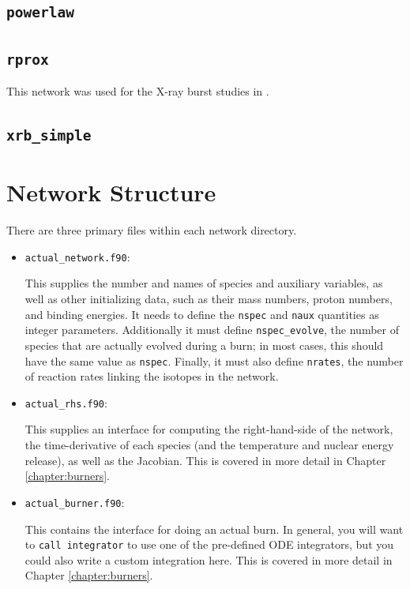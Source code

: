 \subsection{{\tt powerlaw}}


\subsection{{\tt rprox}}

This network was used for the X-ray burst studies in \cite{xrb:II,xrb:III}.


\subsection{{\tt xrb\_simple}}



\section{Network Structure}
\label{section:network_structure}

There are three primary files within each network directory.

\begin{itemize}

\item {\tt actual\_network.f90}:

 This supplies the number and names of species and
auxiliary variables, as well as other initializing data, such as their
mass numbers, proton numbers, and binding energies. It needs to define
the {\tt nspec} and {\tt naux} quantities as integer parameters. Additionally
it must define {\tt nspec\_evolve}, the number of species that are actually evolved
during a burn; in most cases, this should have the same value as {\tt nspec}.
Finally, it must also define {\tt nrates}, the number of reaction rates
linking the isotopes in the network.

\item {\tt actual\_rhs.f90}:

This supplies an interface for computing the right-hand-side
of the network, the time-derivative of each species (and the temperature and
nuclear energy release), as well as the Jacobian. This is covered in more detail
in Chapter \ref{chapter:burners}.

\item {\tt actual\_burner.f90}: 

This contains the interface for doing an actual burn.
In general, you will want to {\tt call integrator} to use one of the pre-defined
ODE integrators, but you could also write a custom integration here. This is
covered in more detail in Chapter \ref{chapter:burners}.

\end{itemize}

